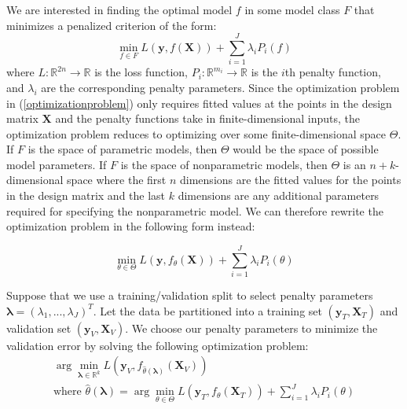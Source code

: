 \documentclass[10pt,letterpaper]{article}
\begin{document}
We are interested in finding the optimal model $f$ in some model class $F$ that minimizes a penalized criterion of the form:
\begin{equation}
\min_{f \in F} L(\boldsymbol{y}, f(\boldsymbol{X})) + \sum\limits_{i=1}^J \lambda_i P_i(f)
\label{optimizationproblem}
\end{equation}
where $L:\mathbb{R}^{2n} \rightarrow \mathbb{R}$ is the loss function, $P_i:\mathbb{R}^{m_i} \rightarrow \mathbb{R}$ is the $i$th penalty function, and $\lambda_i$ are the corresponding penalty parameters. Since the optimization problem in (\ref{optimizationproblem}) only requires fitted values at the points in the design matrix $\boldsymbol{X}$ and the penalty functions take in finite-dimensional inputs, the optimization problem reduces to optimizing over some finite-dimensional space $\Theta$. If $F$ is the space of parametric models, then $\Theta$ would be the space of possible model parameters. If $F$ is the space of nonparametric models, then $\Theta$ is an $n+k$-dimensional space where the first $n$ dimensions are the fitted values for the points in the design matrix and the last $k$ dimensions are any additional parameters required for specifying the nonparametric model. We can therefore rewrite the optimization problem in the following form instead:

\begin{equation}
\min_{\theta \in \Theta} L(\boldsymbol{y}, f_\theta(\boldsymbol{X})) + \sum\limits_{i=1}^J \lambda_i P_i(\theta)
\end{equation}

Suppose that we use a training/validation split to select penalty parameters $\boldsymbol{\lambda} = (\lambda_1, ..., \lambda_J)^T$. Let the data be partitioned into a training set $(\boldsymbol{y}_T , \boldsymbol{X}_T)$ and validation set $(\boldsymbol{y}_V, \boldsymbol{X}_V)$. We choose our penalty parameters to minimize the validation error by solving the following optimization problem:
\begin{equation}
\begin{array}{c}
\arg \min_{\boldsymbol{\lambda} \in \mathbb{R}^k} L(\boldsymbol{y}_V, f_{\hat{\theta}(\boldsymbol{\lambda})}(\boldsymbol{X}_V)) \\
\text{where } {\hat{\theta}(\boldsymbol{\lambda})} = \arg \min_{\theta \in \Theta} L(\boldsymbol{y}_T, f_\theta (\boldsymbol{X}_T)) + \sum\limits_{i=1}^J \lambda_i P_i(\theta)
\end{array}
\label{jointopt2}
\end{equation}
\end{document}
